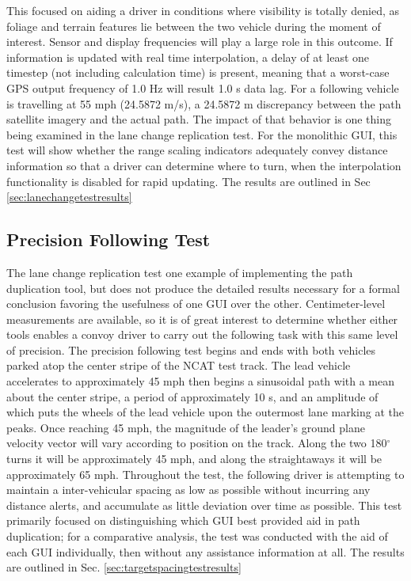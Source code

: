 \documentclass[12pt]{report}
\begin{document}
This focused on aiding a driver in conditions where visibility is totally denied, as foliage and terrain features lie between the two vehicle during the moment of interest. Sensor and display frequencies will play a large role in this outcome. If information is updated with real time interpolation, a delay of at least one timestep (not including calculation time) is present, meaning that a worst-case GPS output frequency of 1.0 Hz will result 1.0 s data lag. For a following vehicle is travelling at 55 mph (24.5872 m/s), a 24.5872 m discrepancy between the path satellite imagery and the actual path. The impact of that behavior is one thing being examined in the lane change replication test. For the monolithic GUI, this test will show whether the range scaling indicators adequately convey distance information so that a driver can determine where to turn, when the interpolation functionality is disabled for rapid updating. The results are outlined in Sec \ref{sec:lanechangetestresults}

\subsection{Precision Following Test} \label{sec:targetspacingtest}
The lane change replication test one example of implementing the path duplication tool, but does not produce the detailed results necessary for a formal conclusion favoring the usefulness of one GUI over the other. Centimeter-level measurements are available, so it is of great interest to determine whether either tools enables a convoy driver to carry out the following task with this same level of precision. The precision following test begins and ends with both vehicles parked atop the center stripe of the NCAT test track. The lead vehicle accelerates to approximately 45 mph then begins a sinusoidal path with a mean about the center stripe, a period of approximately 10 s, and an amplitude of which puts the wheels of the lead vehicle upon the outermost lane marking at the peaks. Once reaching 45 mph, the magnitude of the leader's ground plane velocity vector will vary according to position on the track. Along the two 180$^\circ$ turns it will be approximately 45 mph, and along the straightaways it will be approximately 65 mph. Throughout the test, the following driver is attempting to maintain a inter-vehicular spacing as low as possible without incurring any distance alerts, and accumulate as little deviation over time as possible. 
This test primarily focused on distinguishing which GUI best provided aid in path duplication; for a comparative analysis, the test was conducted with the aid of each GUI individually, then without any assistance information at all. The results are outlined in Sec. \ref{sec:targetspacingtestresults}
\end{document}
